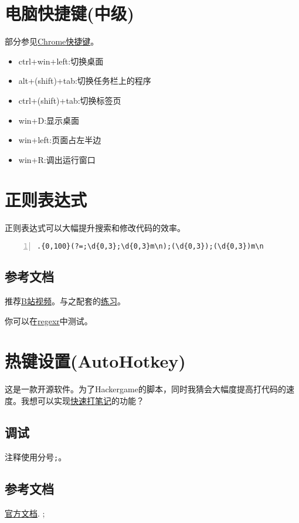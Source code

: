 \documentclass[11pt]{amsart}
\begin{document}
\section{电脑快捷键(中级)}
部分参见\href{https://zhuanlan.zhihu.com/p/42281412}{Chrome快捷键}。
\begin{itemize}
	\item  ctrl+win+left:切换桌面
	\item  alt+(shift)+tab:切换任务栏上的程序
	\item  ctrl+(shift)+tab:切换标签页
	\item  win+D:显示桌面
	\item  win+left:页面占左半边
	\item  win+R:调出运行窗口
\end{itemize} 
\section{正则表达式}
正则表达式可以大幅提升搜索和修改代码的效率。
\begin{lstlisting}[numbers=left,numberstyle=\tiny,numbersep=10pt]
.{0,100}(?=;\d{0,3};\d{0,3}m\n);(\d{0,3});(\d{0,3})m\n
\end{lstlisting}
\subsection{参考文档}
推荐\href{https://www.bilibili.com/video/BV19t4y1y7qP}{B站视频}。与之配套的\href{https://codejiaonang.com/#/course/regex_chapter1/}{练习}。

你可以在\href{https://regexr-cn.com/}{regexr}中测试。
\section{热键设置(AutoHotkey)}
这是一款开源软件。为了Hackergame的脚本，同时我猜会大幅度提高打代码的速度。我想可以实现\href{https://zhuanlan.zhihu.com/p/60049290}{快速打笔记}的功能？
\subsection{调试}

注释使用分号\lstinline|;|。

\subsection{参考文档}
\href{https://wyagd001.github.io/zh-cn/docs/AutoHotkey.htm}{官方文档}.
;
\end{document}
